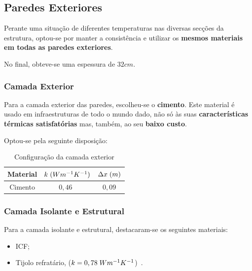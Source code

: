 \documentclass[12pt, a4paper]{article}
\begin{document}
\subsection{Paredes Exteriores}\label{sec:pext}

Perante uma situação de diferentes temperaturas nas diversas secções da estrutura, optou-se por manter a consistência
e utilizar os \textbf{mesmos materiais em todas as paredes exteriores}.

No final, obteve-se uma espessura de $32cm$.

\subsubsection{Camada Exterior}\label{sec:pext_ce}

Para a camada exterior das paredes, escolheu-se o \textbf{cimento}. Este material é usado em infraestruturas de todo o mundo
dado, não só às suas \textbf{características térmicas satisfatórias} mas, também, ao seu \textbf{baixo custo}.

Optou-se pela seguinte disposição:

\begin{table}[htpb]
    \begin{center}
        \begin{tabular}{||c c c||}
            \hline
            Material & $k \hspace{1mm} (Wm^{-1}K^{-1})$ & $\Delta x \hspace{1mm} (m)$ \\ [0.5ex]
            \hline\hline
            Cimento  & $0,46$~\cite{concrete}                          & $0,09$                    \\ \hline
        \end{tabular}
    \end{center}
    \caption{Configura\c{c}\~ao da camada exterior}
\end{table}

\subsubsection{Camada Isolante e Estrutural}\label{sec:pext_cie}

Para a camada isolante e estrutural, destacaram-se os seguintes materiais:

\begin{center}
	\begin{itemize}
		\item ICF;
        \item Tijolo refratário, ($k=0,78 \hspace{1mm} Wm^{-1}K^{-1}$)~\cite{brick}.
	\end{itemize}
\end{center}
\end{document}
